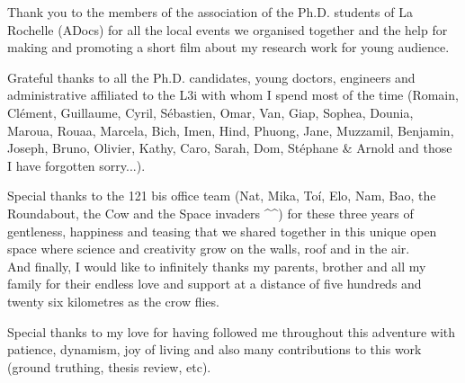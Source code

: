 Thank you to the members of the association of the Ph.D. students of La Rochelle (ADocs) for all the local events we organised together and the help for making and promoting a short film about my research work for young audience.

Grateful thanks to all the Ph.D. candidates, young doctors, engineers and administrative affiliated to the L3i with whom I spend most of the time (Romain, Clément, Guillaume, Cyril, Sébastien, Omar, Van, Giap, Sophea, Dounia, Maroua, Rouaa, Marcela, Bich, Imen, Hind, Phuong, Jane, Muzzamil, Benjamin, Joseph, Bruno, Olivier, Kathy, Caro, Sarah, Dom, Stéphane \& Arnold and those I have forgotten sorry...).

Special thanks to the 121 bis office team (Nat, Mika, To\'{i}, Elo, Nam, Bao, the Roundabout, the Cow and the Space invaders \^{ }\^{ }) for these three years of gentleness, happiness and teasing that we shared together in this unique open space where science and creativity grow on the walls, roof and in the air.
\\

And finally, I would like to infinitely thanks my parents, brother and all my family for their endless love and support at a distance of five hundreds and twenty six kilometres as the crow flies.

Special thanks to my love for having followed me throughout this adventure with patience, dynamism, joy of living and also many contributions to this work (ground truthing, thesis review, etc).





